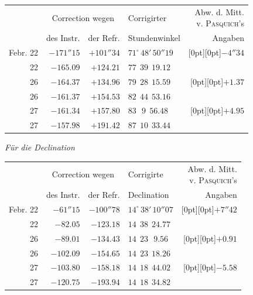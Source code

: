 \begin{center}\footnotesize\setlength{\tabcolsep}{4pt}
\begin{tabular}{r|r|r|l|r}
 & \multicolumn{2}{c|}{Correction wegen} & Corrigirter & \shortstack{Abw. d. Mitt.\\v. \textsc{Pasquich}'s}\\
 & des Instr. & der Refr. & Stundenwinkel & Angaben \\
\hline
Febr. 22 & $-171''15$ & $+101''34$ & $71^\circ\,48'\,50''19$ & \raisebox{-5.5pt}[0pt][0pt]{$-4''34$} \\
22 & $-165.09$ & $+124.21$ & $77\ \ 39\ \ 19.12$ & \\
26 & $-164.37$ & $+134.96$ & $79\ \ 28\ \ 15.59$ & \raisebox{-5.5pt}[0pt][0pt]{$+1.37$} \\
26 & $-161.37$ & $+154.53$ & $82\ \ 44\ \ 53.16$ & \\
27 & $-161.34$ & $+157.80$ & $83\ \ \ 9\ \ 56.48$ & \raisebox{-5.5pt}[0pt][0pt]{$+4.95$} \\
27 & $-157.98$ & $+191.42$ & $87\ \ 10\ \ 33.44$ & \\
\end{tabular}
\end{center}

\begin{center}\footnotesize\setlength{\tabcolsep}{4pt}
\emph{Für die Declination}
\end{center}

\begin{center}\footnotesize\setlength{\tabcolsep}{4pt}
\begin{tabular}{r|r|r|l|r}
 & \multicolumn{2}{c|}{Correction wegen} & Corrigirte & \shortstack{Abw. d. Mitt.\\v. \textsc{Pasquich}'s}\\
 & des Instr. & der Refr. & Declination & Angaben \\
\hline
Febr. 22 & $-61''15$ & $-100''78$ & $14^\circ\,38'\,10''07$ & \raisebox{-5.5pt}[0pt][0pt]{$+7''42$} \\
22 & $-82.05$ & $-123.18$ & $14\ \ 38\ \ 24.77$ & \\
26 & $-89.01$ & $-134.43$ & $14\ \ 23\ \ \ 9.56$ & \raisebox{-5.5pt}[0pt][0pt]{$+0.91$} \\
26 & $-102.09$ & $-154.65$ & $14\ \ 23\ \ 18.26$ & \\
27 & $-103.80$ & $-158.18$ & $14\ \ 18\ \ 44.02$ & \raisebox{-5.5pt}[0pt][0pt]{$-5.58$} \\
27 & $-120.75$ & $-193.94$ & $14\ \ 18\ \ 34.82$ & \\
\end{tabular}
\end{center}

